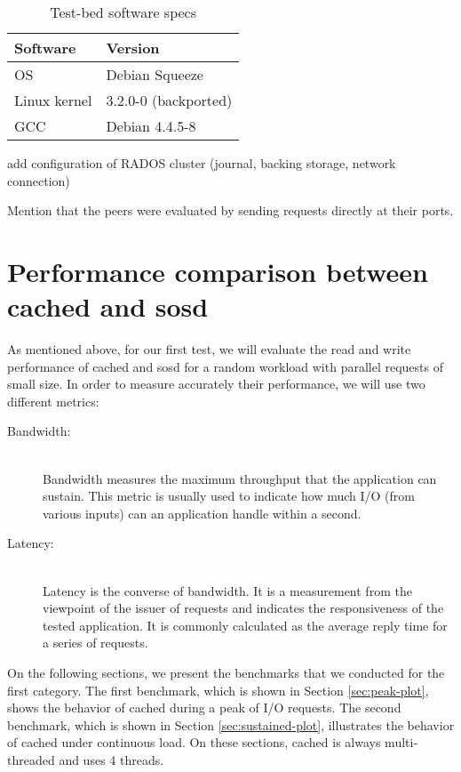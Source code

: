 \begin{table}[H]
	\centering
	\begin{tabular}{ | l | l | }
		\hline
		Software & Version \\ \hline \hline
		OS &  Debian Squeeze \\ \hline
		Linux kernel & 3.2.0-0 (backported) \\ \hline
		GCC & Debian 4.4.5-8 \\ \hline
	\end{tabular}
	\caption{Test-bed software specs}
	\label{tab:software-specs}
\end{table}

\todo add configuration of RADOS cluster (journal, backing storage, network 
connection)

\fixme Mention that the peers were evaluated by sending requests directly at 
their ports.

\section{Performance comparison between cached and sosd}
\label{sec:vs-plot}

As mentioned above, for our first test, we will evaluate the read and write 
performance of cached and sosd for a random workload with parallel requests of 
small size. In order to measure accurately their performance, we will use two 
different metrics:

\begin{description}
	\item[Bandwidth:] \hfill \\
		Bandwidth measures the maximum throughput that the application 
		can sustain. This metric is usually used to indicate how much 
		I/O (from various inputs) can an application handle within a 
		second.
	\item[Latency:] \hfill \\
		Latency is the converse of bandwidth. It is a measurement from 
		the viewpoint of the issuer of requests and indicates the 
		responsiveness of the tested application. It is commonly 
		calculated as the average reply time for a series of requests.
\end{description}

On the following sections, we present the benchmarks that we conducted for the 
first category. The first benchmark, which is shown in Section 
\ref{sec:peak-plot}, shows the behavior of cached during a peak of I/O 
requests.  The second benchmark, which is shown in Section 
\ref{sec:sustained-plot}, illustrates the behavior of cached under continuous 
load.  On these sections, cached is always multi-threaded and uses 4 threads.

